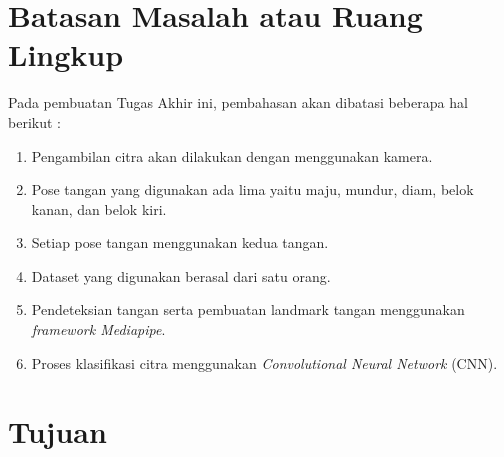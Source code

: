 

\section{Batasan Masalah atau Ruang Lingkup}

Pada pembuatan Tugas Akhir ini, pembahasan akan dibatasi beberapa hal berikut :
\begin{enumerate}
	\item Pengambilan citra akan dilakukan dengan menggunakan kamera.
	\item Pose tangan yang digunakan ada lima yaitu maju, mundur, diam, belok kanan, dan belok kiri.
	\item Setiap pose tangan menggunakan kedua tangan.
	\item Dataset yang digunakan berasal dari satu orang.
	\item Pendeteksian tangan serta pembuatan landmark tangan  menggunakan \emph{framework Mediapipe}.
	\item Proses klasifikasi citra menggunakan \emph{Convolutional Neural Network} (CNN).
\end{enumerate}

\section{Tujuan}

